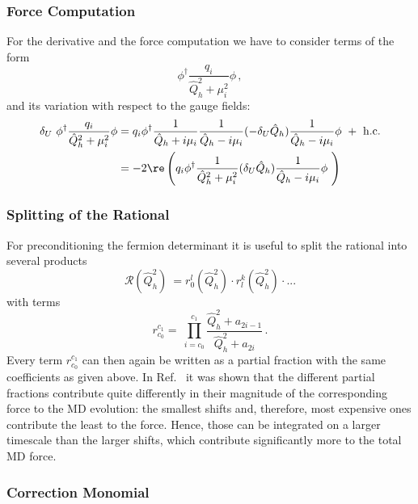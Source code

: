 \subsubsection{Force Computation}

For the derivative and the force computation we have to consider terms
of the form
\[      
\phi^\dagger \frac{q_i}{\hat Q_h^2 + \mu_i^2}\phi\,,
\]
and its variation with respect to the gauge fields:
\[      
\begin{split}   
\delta_U\  \phi^\dagger \frac{q_i}{\hat Q_h^2 + \mu_i^2}\phi &=
q_i\phi^\dagger\frac{1}{\hat Q_h + i\mu_i}\frac{1}{\hat Q_h -
i\mu_i}(-\delta_U \hat Q_h)\frac{1}{\hat Q_h -i\mu_i}\phi\ +\
\textrm{h.c.}\\
&= -2 \re\left( q_i\phi^\dagger\frac{1}{\hat Q_h^2 + \mu_i^2}
(\delta_U \hat Q_h)\frac{1}{\hat Q_h -i\mu_i}\phi\ \right)
\end{split}
\]

\subsubsection{Splitting of the Rational}

For preconditioning the fermion determinant it is useful to split the
rational into several products
\[
\mathcal{R}(\hat Q_h^2)\ = r_{0}^{l}(\hat Q_h^2)\cdot r_{l}^{k}(\hat
Q_h^2)\cdot ...
\]
with terms
\[
r_{c_0}^{c_1} = \ \prod_{i = c_0}^{c_1} \frac{\hat Q_h^2 +
  a_{2i-1}}{\hat Q_h^2 + a_{2i}}\,.
\]
Every term $r_{c_0}^{c_1}$ can then again be written as a partial
fraction with the same coefficients as given above. In
Ref.~\cite{Clark:2006fx} it was shown that the different partial 
fractions contribute quite differently in their magnitude of the
corresponding force to the MD evolution: the smallest shifts and,
therefore, most expensive ones contribute the least to the
force. Hence, those can be integrated on a larger timescale than the
larger shifts, which contribute significantly more to the total MD
force.

\subsubsection{Correction Monomial}

